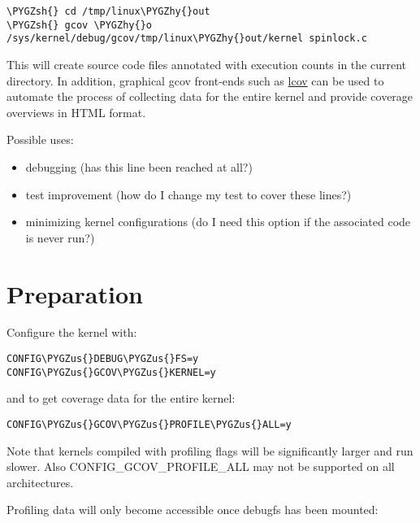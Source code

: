 \documentclass[a4paper,8pt,english]{sphinxmanual}
\def\PYGZus{\char`\_}
\def\PYGZsh{\char`\#}
\def\PYGZhy{\char`\-}
\begin{document}
\begin{Verbatim}[commandchars=\\\{\}]
\PYGZsh{} cd /tmp/linux\PYGZhy{}out
\PYGZsh{} gcov \PYGZhy{}o /sys/kernel/debug/gcov/tmp/linux\PYGZhy{}out/kernel spinlock.c
\end{Verbatim}

This will create source code files annotated with execution counts
in the current directory. In addition, graphical gcov front-ends such
as \href{http://ltp.sourceforge.net/coverage/lcov.php}{lcov} can be used to automate the process of collecting data
for the entire kernel and provide coverage overviews in HTML format.

Possible uses:
\begin{itemize}
\item {} 
debugging (has this line been reached at all?)

\item {} 
test improvement (how do I change my test to cover these lines?)

\item {} 
minimizing kernel configurations (do I need this option if the
associated code is never run?)

\end{itemize}


\section{Preparation}
\label{dev-tools/gcov:lcov}\label{dev-tools/gcov:preparation}
Configure the kernel with:

\begin{Verbatim}[commandchars=\\\{\}]
CONFIG\PYGZus{}DEBUG\PYGZus{}FS=y
CONFIG\PYGZus{}GCOV\PYGZus{}KERNEL=y
\end{Verbatim}

and to get coverage data for the entire kernel:

\begin{Verbatim}[commandchars=\\\{\}]
CONFIG\PYGZus{}GCOV\PYGZus{}PROFILE\PYGZus{}ALL=y
\end{Verbatim}

Note that kernels compiled with profiling flags will be significantly
larger and run slower. Also CONFIG\_GCOV\_PROFILE\_ALL may not be supported
on all architectures.

Profiling data will only become accessible once debugfs has been
mounted:
\end{document}
